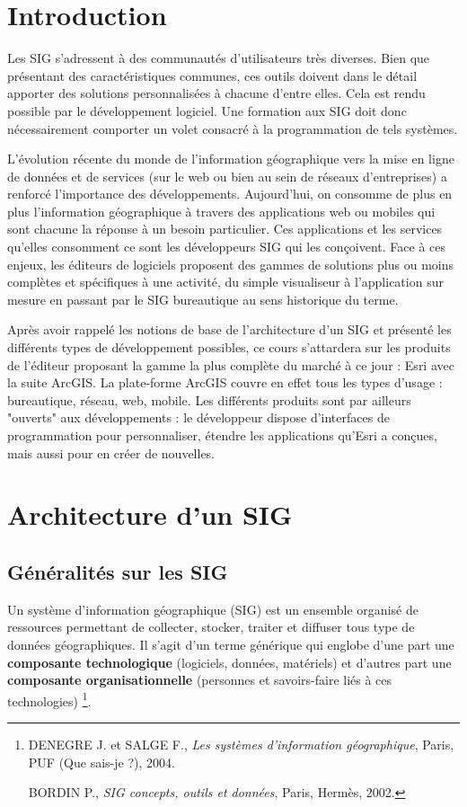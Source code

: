 \documentclass[11pt]{article}
\begin{document}
\tableofcontents
\newpage



\section{Introduction}
Les SIG s’adressent à des communautés d’utilisateurs très diverses. Bien que présentant des caractéristiques communes, ces outils doivent dans le détail apporter des solutions personnalisées à chacune d’entre elles. Cela est rendu possible par le développement logiciel. Une formation aux SIG doit donc nécessairement comporter un volet consacré à la programmation de tels systèmes.

L’évolution récente du monde de l’information géographique vers la mise en ligne de données et de services (sur le web ou bien au sein de réseaux d’entreprises) a renforcé l’importance des développements. Aujourd’hui, on consomme de plus en plus l’information géographique à travers des applications web ou mobiles qui sont chacune la réponse à un besoin particulier. Ces applications et les services qu’elles consomment ce sont les développeurs SIG qui les conçoivent.
Face à ces enjeux, les éditeurs de logiciels proposent des gammes de solutions plus ou moins complètes et spécifiques à une activité, du simple visualiseur à l'application sur mesure en passant par le SIG bureautique au sens historique du terme. 

Après avoir rappelé les notions de base de l'architecture d'un SIG et présenté les différents types de développement possibles, ce cours s'attardera sur les produits de l'éditeur proposant la gamme la plus complète du marché à ce jour : Esri avec la suite ArcGIS. La plate-forme ArcGIS couvre en effet tous les types d'usage : bureautique, réseau, web, mobile. Les différents produits sont par ailleurs "ouverts" aux développements : le développeur dispose d'interfaces de programmation pour personnaliser, étendre les applications qu'Esri a conçues, mais aussi pour en créer de nouvelles.
\newpage


\section{Architecture d'un SIG}

\subsection{Généralités sur les SIG}
Un système d'information géographique (SIG) est un ensemble organisé de ressources permettant de collecter, stocker, traiter et diffuser tous type de données géographiques. Il s'agit d'un terme générique qui englobe d'une part une \textbf{composante technologique} (logiciels, données, matériels) et d'autres part une \textbf{composante organisationnelle} (personnes et savoirs-faire liés à ces technologies)
\footnote{DENEGRE J. et SALGE F., \textit{Les systèmes d'information géographique}, Paris, PUF (Que sais-je ?), 2004.

BORDIN P., \textit{SIG concepts, outils et données}, Paris, Hermès, 2002.}.
\end{document}
